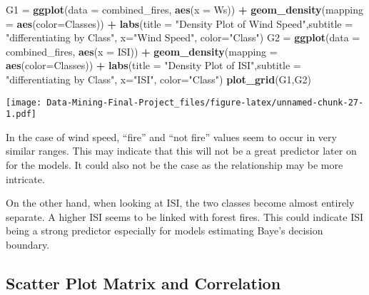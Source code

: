 \documentclass[
]{article}
\newenvironment{Shaded}{\begin{snugshade}}{\end{snugshade}}
\newcommand{\AttributeTok}[1]{\textcolor[rgb]{0.13,0.29,0.53}{#1}}
\newcommand{\FunctionTok}[1]{\textcolor[rgb]{0.13,0.29,0.53}{\textbf{#1}}}
\newcommand{\NormalTok}[1]{#1}
\newcommand{\OtherTok}[1]{\textcolor[rgb]{0.56,0.35,0.01}{#1}}
\newcommand{\SpecialCharTok}[1]{\textcolor[rgb]{0.81,0.36,0.00}{\textbf{#1}}}
\newcommand{\StringTok}[1]{\textcolor[rgb]{0.31,0.60,0.02}{#1}}
\begin{document}
\begin{Shaded}
\begin{Highlighting}[]
\NormalTok{G1 }\OtherTok{=} \FunctionTok{ggplot}\NormalTok{(}\AttributeTok{data =}\NormalTok{ combined\_fires, }\FunctionTok{aes}\NormalTok{(}\AttributeTok{x =}\NormalTok{ Ws)) }\SpecialCharTok{+} 
  \FunctionTok{geom\_density}\NormalTok{(}\AttributeTok{mapping =} \FunctionTok{aes}\NormalTok{(}\AttributeTok{color=}\NormalTok{Classes)) }\SpecialCharTok{+} 
  \FunctionTok{labs}\NormalTok{(}\AttributeTok{title =} \StringTok{"Density Plot of Wind Speed"}\NormalTok{,}\AttributeTok{subtitle =} \StringTok{"differentiating by Class"}\NormalTok{, }\AttributeTok{x=}\StringTok{"Wind Speed"}\NormalTok{, }\AttributeTok{color=}\StringTok{"Class"}\NormalTok{)}
\NormalTok{G2 }\OtherTok{=} \FunctionTok{ggplot}\NormalTok{(}\AttributeTok{data =}\NormalTok{ combined\_fires, }\FunctionTok{aes}\NormalTok{(}\AttributeTok{x =}\NormalTok{ ISI)) }\SpecialCharTok{+} 
  \FunctionTok{geom\_density}\NormalTok{(}\AttributeTok{mapping =} \FunctionTok{aes}\NormalTok{(}\AttributeTok{color=}\NormalTok{Classes)) }\SpecialCharTok{+} 
  \FunctionTok{labs}\NormalTok{(}\AttributeTok{title =} \StringTok{"Density Plot of ISI"}\NormalTok{,}\AttributeTok{subtitle =} \StringTok{"differentiating by Class"}\NormalTok{, }\AttributeTok{x=}\StringTok{"ISI"}\NormalTok{, }\AttributeTok{color=}\StringTok{"Class"}\NormalTok{)}
\FunctionTok{plot\_grid}\NormalTok{(G1,G2)}
\end{Highlighting}
\end{Shaded}

\texttt{[image: Data-Mining-Final-Project\_files/figure-latex/unnamed-chunk-27-1.pdf]}

In the case of wind speed, ``fire'' and ``not fire'' values seem to
occur in very similar ranges. This may indicate that this will not be a
great predictor later on for the models. It could also not be the case
as the relationship may be more intricate.

On the other hand, when looking at ISI, the two classes become almost
entirely separate. A higher ISI seems to be linked with forest fires.
This could indicate ISI being a strong predictor especially for models
estimating Baye's decision boundary.

\subsection{Scatter Plot Matrix and
Correlation}\label{scatter-plot-matrix-and-correlation}
\end{document}
